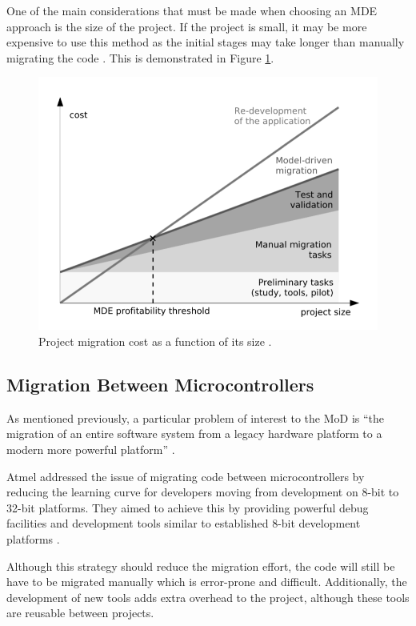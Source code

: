 \documentclass{UoYCSproject}
\begin{document}
One of the main considerations that must be made when choosing an MDE approach is the size of the project. If the project is small, it may be more expensive to use this method as the initial stages may take longer than manually migrating the code \parencite{fleurey2007model}. This is demonstrated in Figure \ref{fig:costvsize}.

\begin{figure}[h!]
  \centering
  \includegraphics[width=0.6\linewidth]{graphics/costvsize.png}
  \caption{Project migration cost as a function of its size \parencite{fleurey2007model}.}
  \label{fig:costvsize}
\end{figure}

\subsection{Migration Between Microcontrollers} \label{mc_migration}
As mentioned previously, a particular problem of interest to the MoD is ``the migration of an entire software system from a legacy hardware platform to a modern more powerful platform'' \parencite{gerasimou2017technical}.

Atmel addressed the issue of migrating code between microcontrollers by reducing the learning curve for developers moving from development on 8-bit to 32-bit platforms. They aimed to achieve this by providing powerful debug facilities and development tools similar to established 8-bit development platforms \parencite{wilbrink2004facilitating}.

Although this strategy should reduce the migration effort, the code will still be have to be migrated manually which is error-prone and difficult. Additionally, the development of new tools adds extra overhead to the project, although these tools are reusable between projects.
\end{document}
